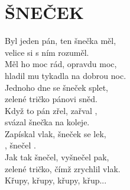 \section*{\Huge ŠNEČEK}

Byl jeden pán, ten šnečka měl,\\
velice si s ním rozuměl.\\
Měl ho moc rád, opravdu moc,\\
hladil mu tykadla na dobrou noc.\\

Jednoho dne se šneček splet,\\
zelené tričko pánovi sněd.\\
Když to pán zřel, zařval ,\\
svázal šnečka na koleje.\\

Zapískal vlak, šneček se lek,\\
, šnečel .\\
Jak tak šnečel, vyšnečel pak,\\
zelené tričko, čímž zrychlil vlak.\\

Křupy, křupy, křupy, křup...

\newpage
